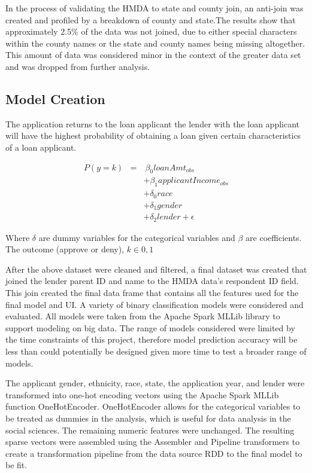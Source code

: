 \documentclass[conference,compsoc]{IEEEtran}
\begin{document}
In the process of validating the HMDA to state and county join, an anti-join was created and profiled by a breakdown of county and state.The results show that approximately 2.5\% of the data was not joined, due to either special characters within the county names or the state and county names being missing altogether. This amount of data was considered minor in the context of the greater data set and was dropped from further analysis.


\subsection{Model Creation}

The application returns to the loan applicant the lender with the loan applicant will have the highest probability of obtaining a loan given certain characteristics of a loan applicant.  

\begin{eqnarray*}
P(y=k) & = & \ \beta_0 loanAmt_{obs}  \\
& &  + \beta_1 applicantIncome_{obs} \\
& & + \delta_0 race  \\ 
& &  + \delta_1 gender \\
& & +  \delta_2 lender + \epsilon
\end{eqnarray*}

Where $\delta$ are dummy variables for the categorical variables and $\beta$ are coefficients. The outcome (approve or deny), $k \in 0,1$

 \vspace{5mm}

After the above dataset were cleaned and filtered, a final dataset was created that joined the lender parent ID and name to the HMDA data’s respondent ID field. This join created the final data frame that contains all the features used for the final model and UI.
A variety of binary classification models were considered and evaluated. All models were taken from the Apache Spark MLLib library to support modeling on big data. The range of models considered were limited by the time constraints of this project, therefore model prediction accuracy will be less than could potentially be designed given more time to test a broader range of models. 

The applicant gender, ethnicity, race, state, the application year, and lender were transformed into one-hot encoding vectors using the Apache Spark MLLib function OneHotEncoder.  OneHotEncoder allows for the categorical variables to be treated as dummies in the analysis, which is useful for data analysis in the social sciences.  The remaining numeric features were unchanged. The resulting sparse vectors were assembled using the Assembler and Pipeline transformers to create a transformation pipeline from the data source RDD to the final model to be fit. 
\end{document}
